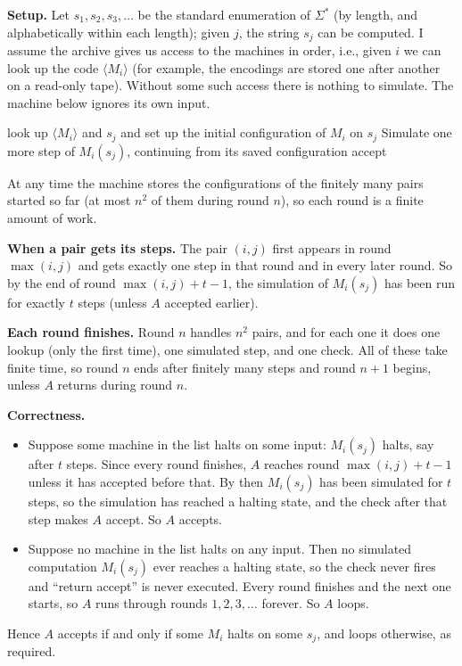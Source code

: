 \documentclass[11pt]{article}
\newcommand{\inner}[1]{\langle #1 \rangle}
\begin{document}
\textbf{Setup.}
Let $s_1, s_2, s_3, \ldots$ be the standard enumeration of $\Sigma^*$ (by length, and alphabetically within each length); given $j$, the string $s_j$ can be computed.
I assume the archive gives us access to the machines in order, i.e., given $i$ we can look up the code $\inner{M_i}$ (for example, the encodings are stored one after another on a read-only tape).
Without some such access there is nothing to simulate.
The machine below ignores its own input.

\begin{algorithmic}[1]
     
         look up $\inner{M_i}$ and $s_j$ and set up the initial configuration of $M_i$ on $s_j$
        \EndIf
        \State Simulate one more step of $M_i(s_j)$, continuing from its saved configuration
         \Return accept
        \EndIf
      \EndFor
    \EndFor
  \EndFunction
\end{algorithmic}
At any time the machine stores the configurations of the finitely many pairs started so far (at most $n^2$ of them during round $n$), so each round is a finite amount of work.

\textbf{When a pair gets its steps.}
The pair $(i, j)$ first appears in round $\max(i, j)$ and gets exactly one step in that round and in every later round.
So by the end of round $\max(i, j) + t - 1$, the simulation of $M_i(s_j)$ has been run for exactly $t$ steps (unless $A$ accepted earlier).

\textbf{Each round finishes.}
Round $n$ handles $n^2$ pairs, and for each one it does one lookup (only the first time), one simulated step, and one check.
All of these take finite time, so round $n$ ends after finitely many steps and round $n+1$ begins, unless $A$ returns during round $n$.

\textbf{Correctness.}
\begin{itemize}
  \item Suppose some machine in the list halts on some input: $M_i(s_j)$ halts, say after $t$ steps.
  Since every round finishes, $A$ reaches round $\max(i,j) + t - 1$ unless it has accepted before that.
  By then $M_i(s_j)$ has been simulated for $t$ steps, so the simulation has reached a halting state, and the check after that step makes $A$ accept.
  So $A$ accepts.
  \item Suppose no machine in the list halts on any input.
  Then no simulated computation $M_i(s_j)$ ever reaches a halting state, so the check never fires and ``return accept'' is never executed.
  Every round finishes and the next one starts, so $A$ runs through rounds $1, 2, 3, \ldots$ forever.
  So $A$ loops.
\end{itemize}
Hence $A$ accepts if and only if some $M_i$ halts on some $s_j$, and loops otherwise, as required.
\end{document}
